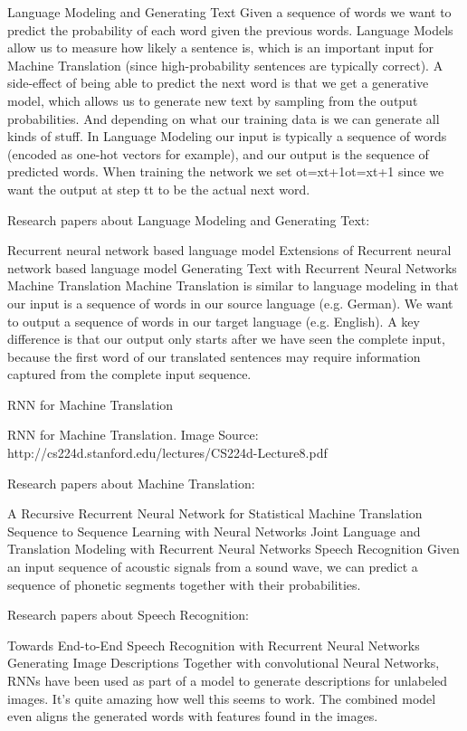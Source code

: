 Language Modeling and Generating Text
Given a sequence of words we want to predict the probability of each word given the previous words. Language Models allow us to measure how likely a sentence is, which is an important input for Machine Translation (since high-probability sentences are typically correct). A side-effect of being able to predict the next word is that we get a generative model, which allows us to generate new text by sampling from the output probabilities. And depending on what our training data is we can generate all kinds of stuff. In Language Modeling our input is typically a sequence of words (encoded as one-hot vectors for example), and our output is the sequence of predicted words. When training the network we set ot=xt+1ot=xt+1 since we want the output at step tt to be the actual next word.

Research papers about Language Modeling and Generating Text:

Recurrent neural network based language model
Extensions of Recurrent neural network based language model
Generating Text with Recurrent Neural Networks
Machine Translation
Machine Translation is similar to language modeling in that our input is a sequence of words in our source language (e.g. German). We want to output a sequence of words in our target language (e.g. English). A key difference is that our output only starts after we have seen the complete input, because the first word of our translated sentences may require information captured from the complete input sequence.

RNN for Machine Translation



RNN for Machine Translation. Image Source: http://cs224d.stanford.edu/lectures/CS224d-Lecture8.pdf

Research papers about Machine Translation:

A Recursive Recurrent Neural Network for Statistical Machine Translation
Sequence to Sequence Learning with Neural Networks
Joint Language and Translation Modeling with Recurrent Neural Networks
Speech Recognition
Given an input sequence of acoustic signals from a sound wave, we can predict a sequence of phonetic segments together with their probabilities.

Research papers about Speech Recognition:

Towards End-to-End Speech Recognition with Recurrent Neural Networks
Generating Image Descriptions
Together with convolutional Neural Networks, RNNs have been used as part of a model to generate descriptions for unlabeled images. It’s quite amazing how well this seems to work. The combined model even aligns the generated words with features found in the images.



